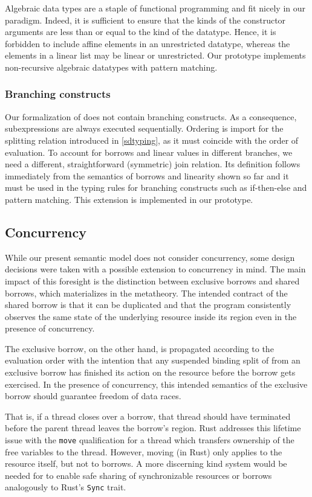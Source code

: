 Algebraic data types are a staple of functional programming and fit nicely
in our paradigm. Indeed, it is sufficient to ensure  that the kinds of
the constructor arguments are less than or equal to the kind of the datatype.
Hence, it is forbidden to include affine elements in an unrestricted
datatype, whereas the elements in a linear list may be linear or
unrestricted.
Our prototype implements non-recursive algebraic datatypes with
pattern matching.

\subsubsection*{Branching constructs}

Our formalization of \lang does not contain branching constructs. As a consequence,
subexpressions are always executed sequentially. Ordering is import
for the splitting relation introduced in \cref{sdtyping}, as it must
coincide with the order of evaluation. To account for borrows and linear
values in different branches, we need a different, straightforward (symmetric) join relation.
Its definition follows immediately from the semantics of borrows and linearity
shown so far and it must be used in the typing rules for branching
constructs such as if-then-else and pattern matching.
This extension is implemented in our prototype.

\subsection{Concurrency}
\label{sec:concurrency}

While our present semantic model does not consider concurrency, some
design decisions were taken with a possible extension to concurrency
in mind. The main impact of this foresight is the distinction between
exclusive borrows and shared borrows, which materializes in the
metatheory. The intended contract of the shared 
borrow is that it can be duplicated and that the program consistently
observes the same state of the underlying resource inside its region
even in the presence of concurrency.

The exclusive borrow, on the other hand, is propagated according to
the evaluation order with the intention that any suspended binding
split of from an exclusive borrow has finished its action on the
resource before the borrow gets exercised. In the presence of
concurrency, this intended semantics of the exclusive borrow should
guarantee freedom of data races.

That is, if a thread closes over a borrow, that thread should have
terminated before the parent thread leaves the borrow's region. Rust
addresses this lifetime issue with the \lstinline/move/ qualification
for a thread which transfers ownership of the free variables to the
thread. However, moving (in Rust) only applies to the resource itself, but not
to borrows. A more discerning kind system would be needed for \lang to
enable safe sharing of synchronizable resources or borrows analogously
to Rust's \texttt{Sync} trait.

\lstDeleteShortInline@

